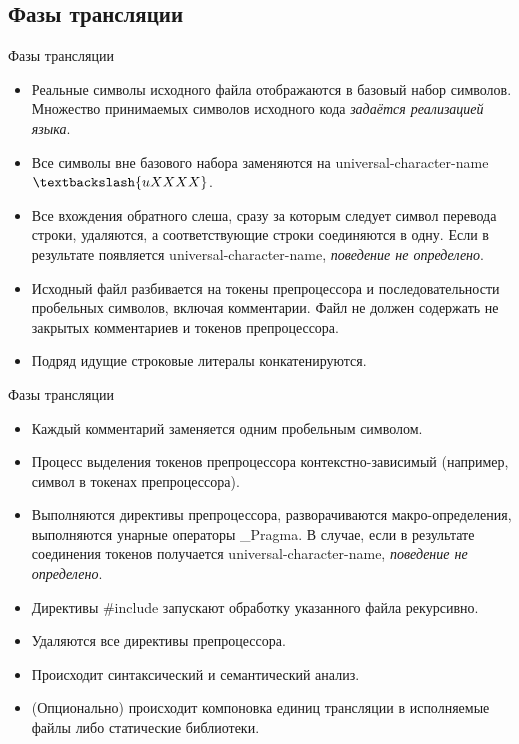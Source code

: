     \subsection{Фазы трансляции}
    \begin{frame}{Фазы трансляции}
        \begin{itemize}
            \item Реальные символы исходного файла отображаются в базовый набор символов.
                Множество принимаемых символов исходного кода \textit{задаётся реализацией языка}.
            \item Все символы вне базового набора заменяются на universal-character-name $\textbackslash{uXXXX}$.
            \item Все вхождения обратного слеша, сразу за которым следует символ перевода строки,
                удаляются, а соответствующие строки соединяются в одну. Если в результате появляется
                universal-character-name, \textit{поведение не определено}.
            \item Исходный файл разбивается на токены препроцессора и последовательности
                пробельных символов, включая комментарии. Файл не должен содержать не закрытых комментариев и
                токенов препроцессора.
            \item Подряд идущие строковые литералы конкатенируются.
        \end{itemize}
    \end{frame}
    \begin{frame}{Фазы трансляции}
        \begin{itemize}
            \item Каждый комментарий заменяется одним пробельным символом.
            \item Процесс выделения токенов препроцессора контекстно-зависимый (например, символ в токенах препроцессора).
            \item Выполняются директивы препроцессора, разворачиваются макро-определения, выполняются унарные операторы \_Pragma.
                В случае, если в результате соединения токенов получается universal-character-name, \textit{поведение не определено}.
            \item Директивы \#include запускают обработку указанного файла рекурсивно.
            \item Удаляются все директивы препроцессора.
            \item Происходит синтаксический и семантический анализ.
            \item (Опционально) происходит компоновка единиц трансляции в исполняемые файлы либо статические библиотеки.
        \end{itemize}
    \end{frame}
